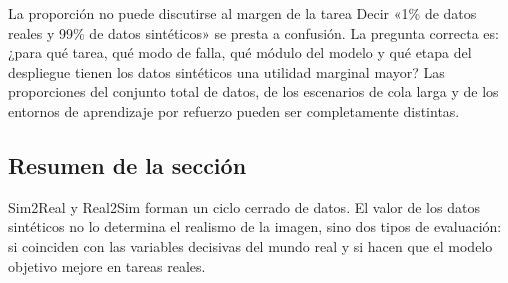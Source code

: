 \begin{warningbox}{La proporción no puede discutirse al margen de la tarea}
Decir «1\% de datos reales y 99\% de datos sintéticos» se presta a confusión. La pregunta correcta es: ¿para qué tarea, qué modo de falla, qué módulo del modelo y qué etapa del despliegue tienen los datos sintéticos una utilidad marginal mayor? Las proporciones del conjunto total de datos, de los escenarios de cola larga y de los entornos de aprendizaje por refuerzo pueden ser completamente distintas.
\end{warningbox}

\subsection{Resumen de la sección}

Sim2Real y Real2Sim forman un ciclo cerrado de datos. El valor de los datos sintéticos no lo determina el realismo de la imagen, sino dos tipos de evaluación: si coinciden con las variables decisivas del mundo real y si hacen que el modelo objetivo mejore en tareas reales.
